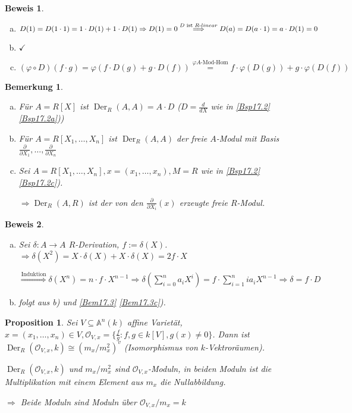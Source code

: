 \documentclass[a4paper, 12pt, numbers=noendperiod, chapterprefix=true, headsepline]{scrbook}
\theoremstyle{break}
\newtheorem{Bem}[Def]{Bemerkung}
\newtheorem{Prop}[Def]{Proposition}
\theoremstyle{nonumberbreak}
\newtheorem{Bew}{Beweis}
\theoremstyle{nonumberplain}
\newcommand{\Sum}{\sum\limits}
\DeclareMathOperator{\Der}{Der}
\newcommand{\A}{\mathbb{A}}
\newcommand{\calO}{\mathcal{O}}
\begin{document}
\begin{Bew}\begin{enumerate}[a)]
\item
	$D(1)=D(1\cdot1)=1\cdot D(1) + 1\cdot D(1) \Rightarrow D(1)=0 \overset{D\text{ ist }R\text-linear}{\Longrightarrow }D(a)=D(a\cdot 1)=a\cdot D(1)=0$
\item
	$\checkmark$
\item
	$(\varphi\circ D)(f\cdot g)=\varphi(f\cdot D(g)+g\cdot D(f))\overset{\varphi A\text{-Mod-Hom}}{=} f\cdot \varphi(D(g))+ g\cdot\varphi(D(f))$
\end{enumerate}\end{Bew}

\begin{Bem}\label{bem17.4}\begin{enumerate}[a)]
\item
	F\"ur $A=R[X]$ ist $\Der_R(A,A)=A\cdot D$ ($D=\frac{d}{dX}$ wie in \ref{Bsp17.2} \ref{Bsp17.2a}))
\item
	F\"ur $A=R[X_1,\ldots ,X_n]$ ist $\Der_R(A,A)$ der freie $A$-Modul mit Basis $\frac{\partial}{\partial X_1},\ldots ,\frac{\partial}{\partial X_n}$
\item\label{bem17.4c}
	Sei $A=R[X_1,\ldots ,X_n], x=(x_1,\ldots ,x_n), M=R$ wie in \ref{Bsp17.2} \ref{Bsp17.2c}).
	
	$\Rightarrow \Der_R(A,R)$ ist der von den $\frac{\partial}{\partial X_i}(x)$ erzeugte freie $R$-Modul.
\end{enumerate}\end{Bem}

\begin{Bew}\begin{enumerate}[a)]
\item
	Sei $\delta: A\to A$ $R$-Derivation, $f:=\delta(X)$. $\Rightarrow \delta(X^2) = X\cdot\delta(X)+X\cdot\delta(X)=2f\cdot X$
	
	$\overset{\text{Induktion}}{\Longrightarrow} \delta(X^n)=n\cdot f\cdot X^{n-1} \Rightarrow \delta(\Sum_{i=0}^na_iX^i) = f\cdot \Sum_{i=1}^nia_iX^{n-1} \Rightarrow \delta=f\cdot D$
\item[c)]
	folgt aus b) und \ref{Bem17.3} \ref{Bem17.3c}).
\end{enumerate}\end{Bew}

\begin{Prop}\label{prop17.5}
Sei $V\subseteq\A^n(k)$ affine Variet\"at, $x=(x_1,\ldots ,x_n)\in V, \calO_{V,x}=\{\frac{f}{g}: f,g\in k[V], g(x)\ne 0\}$. Dann ist $\Der_R(\calO_{V,x},k)\cong(m_x/m_x^2)^v$ (Isomorphismus von $k$-Vektror\"aumen).

$\Der_R(\calO_{V,x},k)$ und $m_x/m_x^2$ sind $\calO_{V,x}$-Moduln, in beiden Moduln ist die Multiplikation mit einem Element aus $m_x$ die Nullabbildung.

$\Rightarrow $ Beide Moduln sind Moduln \"uber $\calO_{V,x}/m_x=k$
\end{Prop}
\end{document}
